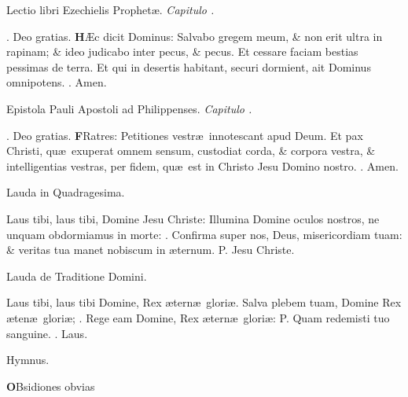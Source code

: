 \documentclass[letter,11pt]{book}
\makeatletter
\DeclareRobustCommand{\Vbar}{\vers@resp{-0.1em}{V}}
\DeclareRobustCommand{\Rbar}{\vers@resp{0pt}{R}}
\newcommand{\vers@resp@sym}{\raisebox{0.2ex}{\rotatebox[origin=c]{-20}{$\m@th\rceil$}}}
\newcommand{\vers@resp}[2]{%
  {\ooalign{\hidewidth\kern#1\vers@resp@sym\hidewidth\cr#2\cr}}%
}%
\def\P{\color{Red} P. \color{black}}
\def\V{\color{Red} \Vbar . \color{black}}
\def\R{\color{Red} \Rbar . \color{black}}
\makeatother
\begin{document}
\begin{multicols*}{2}
\vspace{-.5em} \begin{center} {\color{Red} L}ectio libri Ezechielis Prophet\ae . \itshape Capitulo . \end{center} \vspace{-.5em}
\par \noindent \R Deo gratias.
\lettrine[lines=2]{\bfseries \color{Red} H}{}\AE c dicit Dominus: Salvabo gregem meum, \& non erit ultra in rapinam; \& ideo judicabo inter pecus, \& pecus. Et cessare faciam bestias pessimas de terra. Et qui in desertis habitant, securi dormient, ait Dominus omnipotens. \R Amen.
\vspace{-.5em} \begin{center} {\color{Red} E}pistola Pauli Apostoli ad Philippenses. \itshape Capitulo . \end{center} \vspace{-.5em}
\par \noindent \R Deo gratias.
\lettrine[lines=2]{\bfseries \color{Red} F}{}Ratres: Petitiones vestr\ae \ innotescant apud Deum. Et pax Christi, qu\ae \ exuperat omnem sensum, custodiat corda, \& corpora vestra, \& intelligentias vestras, per fidem, qu\ae \ est in Christo Jesu Domino nostro. \R Amen.
\vspace{-.5em} \begin{center} \color{Red} Lauda in Quadragesima. \end{center} \vspace{-.5em}
\par \noindent Laus tibi, laus tibi, Domine Jesu Christe: Illumina Domine oculos nostros, ne unquam obdormiamus in morte: \V Confirma super nos, Deus, misericordiam tuam: \& veritas tua manet nobiscum in \ae ternum. \P Jesu Christe.
\vspace{-.5em} \begin{center} \color{Red} Lauda de Traditione Domini. \end{center} \vspace{-.5em}
\par \noindent Laus tibi, laus tibi Domine, Rex \ae tern\ae \ glori\ae . Salva plebem tuam, Domine Rex \ae ten\ae \ glori\ae ; \V Rege eam Domine, Rex \ae tern\ae \ glori\ae : \P Quam redemisti tuo sanguine. \V Laus.
\vspace{-.5em} \begin{center} \color{Red} Hymnus. \end{center} \vspace{-.5em}
\lettrine[lines=2]{\bfseries \color{Red} O}{}Bsidiones obvias

\end{multicols*}
\end{document}
